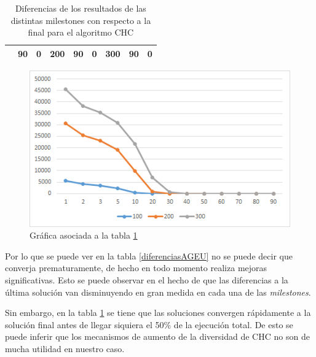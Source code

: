 \begin{table}[h]
\begin{tabular}{|cclcclccl|}
\rowcolor[HTML]{DAE8FC} 
\multicolumn{1}{|c|}{\multirow{-13}{*}{\cellcolor[HTML]{FFFFC7}\textbf{100}}} & \multicolumn{1}{c|}{\cellcolor[HTML]{DAE8FC}90}        & \multicolumn{1}{l|}{\cellcolor[HTML]{DAE8FC}0}          & \multicolumn{1}{c|}{\multirow{-13}{*}{\cellcolor[HTML]{FFFFC7}\textbf{200}}} & \multicolumn{1}{c|}{\cellcolor[HTML]{DAE8FC}90}        & \multicolumn{1}{l|}{\cellcolor[HTML]{DAE8FC}0}          & \multicolumn{1}{c|}{\multirow{-13}{*}{\cellcolor[HTML]{FFFFC7}\textbf{300}}} & \multicolumn{1}{c|}{\cellcolor[HTML]{DAE8FC}90}        & 0          \\ \hline
\end{tabular}
\caption{\label{DiferenciasCHC}Diferencias de los resultados de las distintas milestones con respecto a la final para el algoritmo CHC}
\end{table}

\begin{figure}[h]
		\centering
		\includegraphics[scale=1]{imagenes/Experimental/DiferenciasCHC.png}
        \caption{Gráfica asociada a la tabla \ref{DiferenciasCHC}}
        \label{fig:DiferenciasCHC}
\end{figure}

Por lo que se puede ver en la tabla \ref{diferenciasAGEU} no se puede decir que converja prematuramente, de hecho en todo momento realiza mejoras significativas. 
Esto se puede observar en el hecho de que las diferencias a la última solución van disminuyendo en gran medida en cada una de las \textit{milestones}. 

Sin embargo, en la tabla \ref{DiferenciasCHC} se tiene que las soluciones convergen rápidamente a la solución final antes de llegar siquiera el 50\% de la ejecución total. 
De esto se puede inferir que los mecanismos de aumento de la diversidad de CHC no son de mucha utilidad en nuestro caso. 

